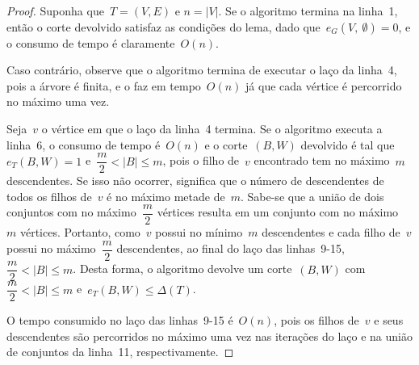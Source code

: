 \bigskip

	
	\begin{proof}
	Suponha que~${T=(V,E)}$ e ${n=|V|}$.
	Se o algoritmo termina na linha~1, então o corte 
	devolvido satisfaz 
	as condições do lema, dado 
	que~${e_G(V,\ \emptyset) = 0}$,
	e o consumo de tempo é claramente~$O(n)$. 

	Caso contrário, observe que o algoritmo termina de executar o laço
	da linha~4, pois a árvore é finita, e o faz em tempo~$O(n)$
	já que cada vértice é percorrido no máximo uma vez.

	Seja~$v$ o vértice em que o laço da linha~4 termina.
	Se o algoritmo executa a linha~6, o consumo de tempo é~$O(n)$
	e o corte~$(B,W)$ devolvido é tal que~${e_T(B,W) = 1}$
	e~${\dfrac{m}{2}<|B|\le m}$, pois o filho de~$v$ encontrado tem no 
	máximo~$m$ descendentes.
	Se isso não ocorrer, significa que o número de descendentes de 
	todos os filhos de~$v$ é no máximo metade de~$m$.
	Sabe-se que a união de dois conjuntos
	com no máximo~${\dfrac{m}{2}}$ vértices resulta em um conjunto
	com no máximo~$m$ vértices.
	Portanto, como~$v$ possui no mínimo~$m$ descendentes
	e cada filho de~$v$ possui no máximo~${\dfrac{m}{2}}$
	descendentes, 
	ao final do laço das linhas~9-15,~${\dfrac{m}{2} < |B| \le m}$. 
	Desta forma, o algoritmo devolve um corte~$(B,W)$
	com~${\dfrac{m}{2} < |B| \le m}$ e~${e_T(B,W) \le \Delta(T)}$.

	O tempo consumido no laço das linhas~9-15 é~$O(n)$, pois
	os filhos de~$v$ e seus descendentes são percorridos no máximo
	uma vez nas iterações do laço e na união de conjuntos da linha~11,
	respectivamente.
	\end{proof}


